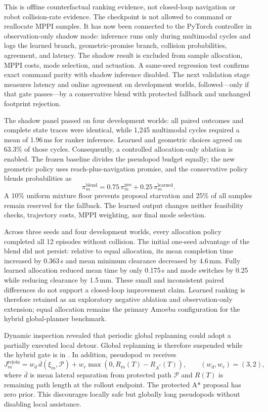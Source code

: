 \documentclass[11pt,a4paper]{article}
\newcommand{\code}[1]{\texttt{\detokenize{#1}}}
\begin{document}
This is offline counterfactual ranking evidence, not closed-loop navigation or
robot collision-rate evidence. The checkpoint is not allowed to command or
reallocate MPPI samples. It has now been connected to the PyTorch controller in
observation-only shadow mode: inference runs only during multimodal
\code{ASSIST} cycles and logs the learned branch, geometric-promise branch,
collision probabilities, agreement, and latency. The shadow result is excluded
from sample allocation, MPPI costs, mode selection, and actuation. A
same-seed regression test confirms exact command parity with shadow inference
disabled. The next validation stage measures latency and online agreement on
development worlds, followed---only if that gate passes---by a conservative
blend with protected fallback and unchanged footprint rejection.

The shadow panel passed on four development worlds: all paired outcomes and
complete state traces were identical, while 1,245 multimodal cycles required a
mean of 1.96\,ms for ranker inference. Learned and geometric choices agreed on
63.3\% of those cycles. Consequently, a controlled allocation-only ablation is
enabled. The frozen baseline divides the pseudopod budget equally; the new
geometric policy uses reach-plus-navigation promise, and the conservative
policy blends probabilities as
\begin{equation}
  \pi_m^{\mathrm{blend}}
  =0.75\,\pi_m^{\mathrm{geo}}+0.25\,\pi_m^{\mathrm{learned}}.
\end{equation}
A 10\% uniform mixture floor prevents proposal starvation and 25\% of all
samples remain reserved for the fallback. The learned output changes neither
feasibility checks, trajectory costs, MPPI weighting, nor final mode selection.

Across three seeds and four development worlds, every allocation policy
completed all 12 episodes without collision. The initial one-seed advantage of
the blend did not persist: relative to equal allocation, its mean completion
time increased by 0.363\,s and mean minimum clearance decreased by
4.6\,mm. Fully learned allocation reduced mean time by only 0.175\,s and mode
switches by 0.25 while reducing clearance by 1.5\,mm. These small and
inconsistent paired differences do not support a closed-loop improvement
claim. Learned ranking is therefore retained as an exploratory negative
ablation and observation-only extension; equal allocation remains the primary
Amoeba configuration for the hybrid global-planner benchmark.

Dynamic inspection revealed that periodic global replanning could adopt a
partially executed local detour. Global replanning is therefore suspended while
the hybrid gate is in \code{ASSIST}. In addition, pseudopod $m$ receives
\begin{equation}
 J_m^{\mathrm{rejoin}}
 =w_d\,\overline{d}(\xi_m,\mathcal P)
 +w_r\max\!\left(0,R_m(T)-R_{A^*}(T)\right),
 \qquad (w_d,w_r)=(3,2),
\end{equation}
where $\overline d$ is mean lateral separation from protected path
$\mathcal P$ and $R(T)$ is remaining path length at the rollout endpoint. The
protected A* proposal has zero prior. This discourages locally safe but
globally long pseudopods without disabling local assistance.
\end{document}

